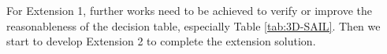 \documentclass[a4paper, 10, conference]{ieeeconf}  %
\begin{document}
For Extension 1, further works need to be achieved to verify or improve the reasonableness of the decision table, especially Table \ref{tab:3D-SAIL}. Then we start to develop Extension 2 to complete the extension solution.
 





\end{document}
